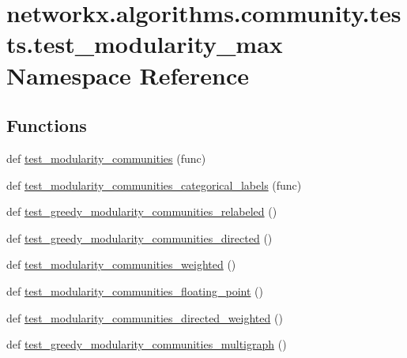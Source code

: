 \hypertarget{namespacenetworkx_1_1algorithms_1_1community_1_1tests_1_1test__modularity__max}{}\section{networkx.\+algorithms.\+community.\+tests.\+test\+\_\+modularity\+\_\+max Namespace Reference}
\label{namespacenetworkx_1_1algorithms_1_1community_1_1tests_1_1test__modularity__max}
\subsection*{Functions}
\begin{DoxyCompactItemize}
\item 
def \hyperlink{namespacenetworkx_1_1algorithms_1_1community_1_1tests_1_1test__modularity__max_aaa93f56512aa44b6fe2d468143c5fc92}{test\+\_\+modularity\+\_\+communities} (func)
\item 
def \hyperlink{namespacenetworkx_1_1algorithms_1_1community_1_1tests_1_1test__modularity__max_a47e47a76a63c78118e7afc18f6dec462}{test\+\_\+modularity\+\_\+communities\+\_\+categorical\+\_\+labels} (func)
\item 
def \hyperlink{namespacenetworkx_1_1algorithms_1_1community_1_1tests_1_1test__modularity__max_a0bbd17c2971c8a661e3591c896541956}{test\+\_\+greedy\+\_\+modularity\+\_\+communities\+\_\+relabeled} ()
\item 
def \hyperlink{namespacenetworkx_1_1algorithms_1_1community_1_1tests_1_1test__modularity__max_a91897233fee48755f8256ed499aabaa4}{test\+\_\+greedy\+\_\+modularity\+\_\+communities\+\_\+directed} ()
\item 
def \hyperlink{namespacenetworkx_1_1algorithms_1_1community_1_1tests_1_1test__modularity__max_a65ec36cd634da77c2758f521dc91611e}{test\+\_\+modularity\+\_\+communities\+\_\+weighted} ()
\item 
def \hyperlink{namespacenetworkx_1_1algorithms_1_1community_1_1tests_1_1test__modularity__max_a14f4dc5f361ac145b8281bb9ea137d91}{test\+\_\+modularity\+\_\+communities\+\_\+floating\+\_\+point} ()
\item 
def \hyperlink{namespacenetworkx_1_1algorithms_1_1community_1_1tests_1_1test__modularity__max_a97451f160fa4ea097cde529724be317a}{test\+\_\+modularity\+\_\+communities\+\_\+directed\+\_\+weighted} ()
\item 
def \hyperlink{namespacenetworkx_1_1algorithms_1_1community_1_1tests_1_1test__modularity__max_a2d8cc005b41902c6b990f01f021b7e47}{test\+\_\+greedy\+\_\+modularity\+\_\+communities\+\_\+multigraph} ()

\end{DoxyCompactItemize}
